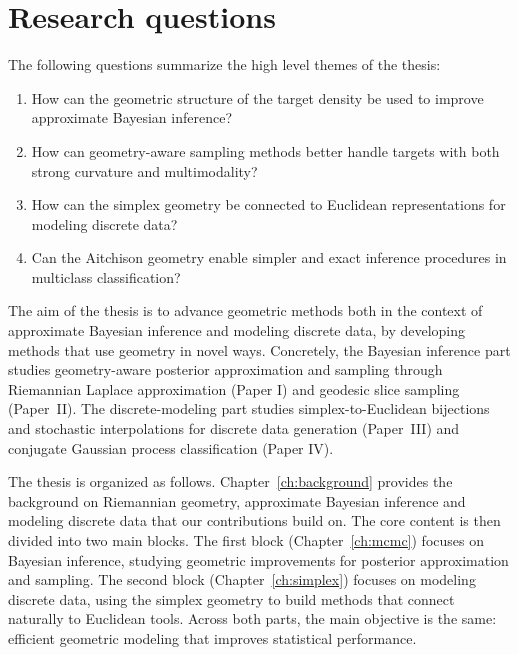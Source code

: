 \section*{Research questions} 
The following questions summarize the high level themes of the thesis:
\begin{enumerate}
    \item How can the geometric structure of the target density be used to improve approximate Bayesian inference?
    \item How can geometry-aware sampling methods better handle targets with both strong curvature and multimodality?
    \item How can the simplex geometry be connected to Euclidean representations for modeling discrete data?
    \item Can the Aitchison geometry enable simpler and exact inference procedures in multiclass classification?
\end{enumerate}


The aim of the thesis is to advance geometric methods both in the context of approximate Bayesian inference and modeling discrete data, by developing methods that use geometry in novel ways. Concretely, the Bayesian inference part studies geometry-aware posterior approximation and sampling through Riemannian Laplace approximation (Paper I) and geodesic slice sampling (Paper~II). The discrete-modeling part studies simplex-to-Euclidean bijections and stochastic interpolations for discrete data generation (Paper~III) and conjugate Gaussian process classification (Paper IV).


The thesis is organized as follows. Chapter~\ref{ch:background} provides the background on  Riemannian geometry, approximate Bayesian inference and modeling discrete data that our contributions build on. 
The core content is then divided into two main blocks. 
The first block (Chapter~\ref{ch:mcmc}) focuses on Bayesian inference, studying geometric improvements for posterior approximation and sampling. The second block (Chapter~\ref{ch:simplex}) focuses on modeling discrete data, using the simplex geometry to build methods that connect naturally to Euclidean tools. Across both parts, the main objective is the same: efficient geometric modeling that improves statistical performance.


